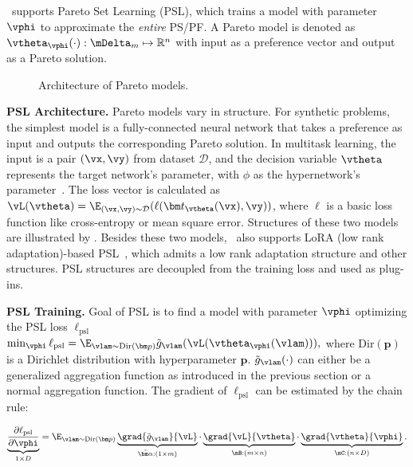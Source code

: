 \algoname~supports Pareto Set Learning (PSL), which trains a model with parameter $\vphi$ to approximate the \emph{entire} PS/PF. A Pareto model is denoted as $\vtheta_\vphi(\cdot) : \mDelta_m \mapsto \mathbb{R}^n$ with input as a preference vector and output as a Pareto solution. 

\begin{wrapfigure}{r}{0.6\textwidth}
    \centering
    \vspace{-15pt}
    \caption{Architecture of Pareto models.}
    \vspace{-15pt}
    \label{fig:psl:arch}
\end{wrapfigure}

\textbf{PSL Architecture.} Pareto models vary in structure. For synthetic problems, the simplest model is a fully-connected neural network that takes a preference as input and outputs the corresponding Pareto solution. In multitask learning, the input is a pair $(\vx, \vy)$ from dataset $\mathcal{D}$, and the decision variable $\vtheta$ represents the target network's parameter, with $\phi$ as the hypernetwork's parameter~\cite{ha2016hypernetworks}. The loss vector is calculated as $\vL(\vtheta) = \E_{(\vx,\vy)\sim \mathcal{D}}(\ell(\bm t_\vtheta(\vx), \vy))$, where $\ell$ is a basic loss function like cross-entropy or mean square error. Structures of these two models are illustrated by . Besides these two models, \algoname~also supports LoRA (low rank adaptation)-based PSL~\cite{chen2024efficient,zhong2024panacea,dimitriadis2024pareto}, which admits a low rank adaptation structure and other structures. PSL structures are decoupled from the training loss and used as plug-ins.

\textbf{PSL Training.} Goal of PSL is to find a model with parameter $\vphi$ optimizing the PSL loss $\ell_\mathrm{psl}$
$
    \min_\vphi \ell_\mathrm{psl} = \E_{\vlam \sim \mathrm{Dir}(\bm p)} \tilde{g}_\vlam(\vL( \vtheta_\vphi(\vlam) )),
$
where $\mathrm{Dir}(\bm p)$ is a Dirichlet distribution with hyperparameter $\bm p$. $\tilde{g}_\vlam(\cdot)$ can either be a generalized aggregation function as introduced in the previous section or a normal aggregation function. The gradient of $\ell_\mathrm{psl}$ can be estimated by the chain rule:

\begin{equation}
    \underbrace{\frac{\partial \ell_\mathrm{psl}}{\partial \vphi}}_{1 \times D}
    = 
    \E_{\vlam \sim \mathrm{Dir}(\bm p)} \underbrace{\grad{\tilde{g}_\vlam}{\vL}}_{\tilde{\bm \alpha}: (1 \times m)} \cdot \underbrace{\grad{\vL}{\vtheta}}_{\mB: (m \times n)} \cdot \underbrace{\grad{\vtheta}{\vphi}}_{\mC: (n \times D)}.
    \label{eqn:grad:psl}
\end{equation}

